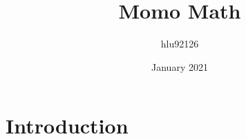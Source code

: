 \documentclass{article}
\title{Momo Math}
\author{hlu92126 }
\date{January 2021}
\begin{document}
\maketitle

\section{Introduction}
\end{document}

